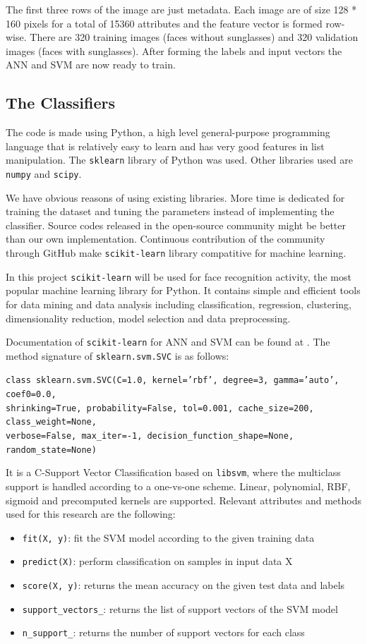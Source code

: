 \documentclass[11pt,a4paper]{article}
\begin{document}
	The first three rows of the image are just metadata. Each image are of size 128 * 160 pixels for a total of 15360 attributes and the feature vector is formed row-wise. There are 320 training images (faces without sunglasses) and 320 validation images (faces with sunglasses). After forming the labels and input vectors the ANN and SVM are now ready to train.
	
	\subsection{The Classifiers}
	The code is made using Python, a high level general-purpose programming language that is relatively easy to learn and has very good features in list manipulation. The \texttt{sklearn} library of Python was used. Other libraries used are \texttt{numpy} and \texttt{scipy}.
	
	We have obvious reasons of using existing libraries. More time is dedicated for training the dataset and tuning the parameters instead of implementing the classifier. Source codes released in the open-source community might be better than our own implementation. Continuous contribution of the community through GitHub make \texttt{scikit-learn} library compatitive for machine learning.
	
	In this project \texttt{scikit-learn} will be used for face recognition activity, the most popular machine learning library for Python. \cite{bib:sklearn} It contains simple and efficient tools for data mining and data analysis including classification, regression, clustering, dimensionality reduction, model selection and data preprocessing.
	
	Documentation of \texttt{scikit-learn} for ANN and SVM can be found at \cite{bib:sklearn}. The method signature of \texttt{sklearn.svm.SVC} is as follows:
	
	\texttt{class sklearn.svm.SVC(C=1.0, kernel='rbf', degree=3, gamma='auto', coef0=0.0, \\shrinking=True, probability=False, tol=0.001, cache\_size=200, class\_weight=None,\\ verbose=False, max\_iter=-1, decision\_function\_shape=None, random\_state=None)}
	
	It is a C-Support Vector Classification based on \texttt{libsvm}, where the multiclass support is handled according to a one-vs-one scheme. Linear, polynomial, RBF, sigmoid and precomputed kernels are supported. Relevant attributes and methods used for this research are the following:
	\begin{itemize}
		\item \texttt{fit(X, y)}: fit the SVM model according to the given training data
		\item \texttt{predict(X)}: perform classification on samples in input data X
		\item \texttt{score(X, y)}: returns the mean accuracy on the given test data and labels
		\item \texttt{support\_vectors\_}: returns the list of support vectors of the SVM model
		\item \texttt{n\_support\_}: returns the number of support vectors for each class
	\end{itemize}
	
\end{document}
